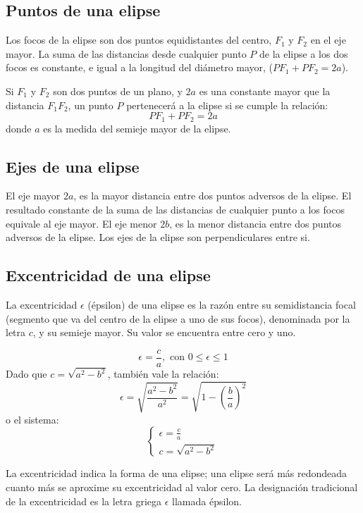 \documentclass[a2,plainboxedsections]{sciposter}
\begin{document}
\begin{multicols}{3}
\subsection{Puntos de una elipse}

Los focos de la elipse son dos puntos equidistantes del centro, $F_1$ y $F_2$ en el eje mayor. La suma de las distancias desde cualquier punto $P$ de la elipse a los dos focos es constante, e igual a la longitud del diámetro mayor, ($PF_1 + PF_2 = 2a$).

Si $F_1$ y $F_2$ son dos puntos de un plano, y $2a$ es una constante mayor que la distancia $F_1F_2$, un punto $P$ pertenecerá a la elipse si se cumple la relación:
\[
P F_1 + P F_2 = 2a 
\]
donde $a$ es la medida del semieje mayor de la elipse.

\subsection{Ejes de una elipse}

El eje mayor $2a$, es la mayor distancia entre dos puntos adversos de la elipse. El resultado constante de la suma de las distancias de cualquier punto a los focos equivale al eje mayor. El eje menor $2b$, es la menor distancia entre dos puntos adversos de la elipse. Los ejes de la elipse son perpendiculares entre si.

\subsection{Excentricidad de una elipse}

La excentricidad $\epsilon$ (épsilon) de una elipse es la razón entre su semidistancia focal (segmento que va del centro de la elipse a uno de sus focos), denominada por la letra $c$, y su semieje mayor. Su valor se encuentra entre cero y uno.

\[
\epsilon=\frac{c}{a},\mbox{ con }0\leq\epsilon\leq1
\]
Dado que $c = \sqrt{a^2-b^2}$, también vale la relación:
\[
\epsilon=\sqrt{\frac{a^2-b^2}{a^2}}
    =\sqrt{1-\left(\frac{b}{a}\right)^2}
 \]
o el sistema:
\[
\begin{cases}
\epsilon=\frac{c}{a}\\
c = \sqrt{a^2-b^2} \end{cases}
\]

La excentricidad indica la forma de una elipse; una elipse será más redondeada cuanto más se aproxime su excentricidad al valor cero. La designación tradicional de la excentricidad es la letra griega $\epsilon$ llamada épsilon.


\end{multicols}
\end{document}
